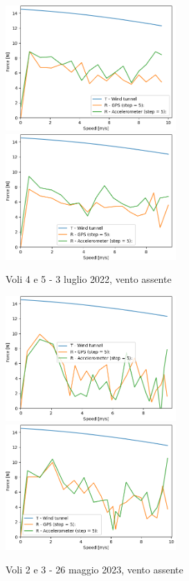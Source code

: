 \documentclass[12pt]{article}
\begin{document}
\begin{figure}[!h]
	\centering
	\includegraphics[width=6.5cm]{img/TvsR-6-4-c}
	\includegraphics[width=6.5cm]{img/TvsR-6-5-c}
	\captionsetup{labelformat=empty}
	\caption{Voli 4 e 5 - 3 luglio 2022, vento assente}
\end{figure}
\begin{figure}[!h]
	\centering
	\includegraphics[width=6.5cm]{img/TvsR-7-2-c}
	\includegraphics[width=6.5cm]{img/TvsR-7-3-c}
	\captionsetup{labelformat=empty}
	\caption{Voli 2 e 3 - 26 maggio 2023, vento assente}
\end{figure}
\end{document}
